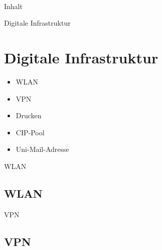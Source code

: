 




\begin{frame}
    \maketitle{} \\
\end{frame}

\begin{frame}{Inhalt}
  \tableofcontents
\end{frame}


\begin{frame}{Digitale Infrastruktur}
  \section{Digitale Infrastruktur}
    \begin{itemize}
      \item{WLAN}
      \item{VPN}
      \item{Drucken}
      \item{CIP-Pool}
      \item{Uni-Mail-Adresse}
    \end{itemize}
\end{frame}


\begin{frame}{WLAN}
  \subsection{WLAN}
\end{frame}


\begin{frame}{VPN}
  \subsection{VPN}
\end{frame}

